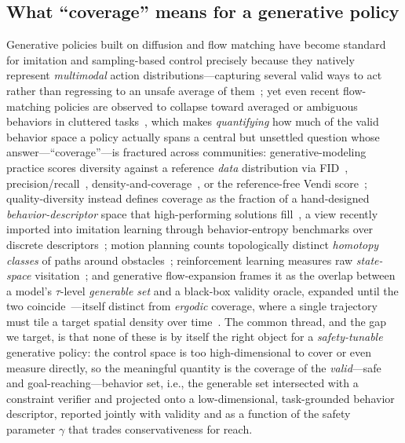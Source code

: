 \subsection{What ``coverage'' means for a generative policy}
Generative policies built on diffusion and flow matching have become standard for imitation and
sampling-based control precisely because they natively represent \emph{multimodal} action
distributions---capturing several valid ways to act rather than regressing to an unsafe average of
them~\cite{chi2023diffusion, florence2021implicit, shafiullah2022behavior, kurtz2025generative};
yet even recent flow-matching policies are observed to collapse toward averaged or ambiguous behaviors
in cluttered tasks~\cite{zhang2025vfp}, which makes \emph{quantifying} how much of the valid behavior
space a policy actually spans a central but unsettled question whose answer---``coverage''---is fractured
across communities: generative-modeling practice scores diversity against a reference \emph{data}
distribution via FID~\cite{heusel2017gans}, precision/recall~\cite{sajjadi2018assessing}, density-and-coverage~\cite{naeem2020reliable},
or the reference-free Vendi score~\cite{friedman2023vendi}; quality-diversity instead defines coverage as
the fraction of a hand-designed \emph{behavior-descriptor} space that high-performing solutions
fill~\cite{mouret2015illuminating, lehman2011abandoning}, a view recently imported into imitation learning
through behavior-entropy benchmarks over discrete descriptors~\cite{jia2024towards}; motion planning counts
topologically distinct \emph{homotopy classes} of paths around obstacles~\cite{bhattacharya2012topological};
reinforcement learning measures raw \emph{state-space} visitation~\cite{bellemare2016unifying}; and
generative flow-expansion frames it as the overlap between a model's $\tau$-level \emph{generable set} and a
black-box validity oracle, expanded until the two coincide~\cite{desanti2026active}---itself distinct from
\emph{ergodic} coverage, where a single trajectory must tile a target spatial density over
time~\cite{sun2025ergodic}. The common thread, and the gap we target, is that none of these is by itself the
right object for a \emph{safety-tunable} generative policy: the control space is too high-dimensional to cover
or even measure directly, so the meaningful quantity is the coverage of the \emph{valid}---safe and
goal-reaching---behavior set, i.e., the generable set intersected with a constraint verifier and projected
onto a low-dimensional, task-grounded behavior descriptor, reported jointly with validity and as a function
of the safety parameter $\gamma$ that trades conservativeness for reach.

